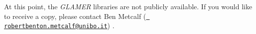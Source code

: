At this point, the {\itshape G\+L\+A\+M\+ER} libraries are not publicly available. If you would like to receive a copy, please contact Ben Metcalf (\href{mailto:robertbenton.metcalf@unibo.it}{\texttt{ robertbenton.\+metcalf@unibo.\+it}}) . 